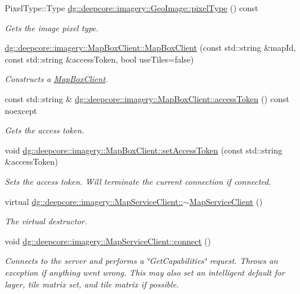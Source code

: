 \begin{DoxyCompactItemize}
Pixel\+Type\+::\+Type \hyperlink{group___imagery_module_gaf5164921d6c4514a57e2aa7243e6c572}{dg\+::deepcore\+::imagery\+::\+Geo\+Image\+::pixel\+Type} () const 
\begin{DoxyCompactList}\small\item\em Gets the image pixel type. \end{DoxyCompactList}\item 
\hyperlink{group___imagery_module_gaa985473361a183892437e5a57175aa25}{dg\+::deepcore\+::imagery\+::\+Map\+Box\+Client\+::\+Map\+Box\+Client} (const std\+::string \&map\+Id, const std\+::string \&access\+Token, bool use\+Tiles=false)
\begin{DoxyCompactList}\small\item\em Constructs a \hyperlink{classdg_1_1deepcore_1_1imagery_1_1_map_box_client}{Map\+Box\+Client}. \end{DoxyCompactList}\item 
const std\+::string \& \hyperlink{group___imagery_module_ga09b8428dd2d706d2816a06509cdefdf3}{dg\+::deepcore\+::imagery\+::\+Map\+Box\+Client\+::access\+Token} () const noexcept
\begin{DoxyCompactList}\small\item\em Gets the access token. \end{DoxyCompactList}\item 
void \hyperlink{group___imagery_module_ga24970dc0f6164b6592cb6a97bab71e15}{dg\+::deepcore\+::imagery\+::\+Map\+Box\+Client\+::set\+Access\+Token} (const std\+::string \&access\+Token)
\begin{DoxyCompactList}\small\item\em Sets the access token. Will terminate the current connection if connected. \end{DoxyCompactList}\item 
virtual \hyperlink{group___imagery_module_ga93933812a2678d47a119231a41b52e2d}{dg\+::deepcore\+::imagery\+::\+Map\+Service\+Client\+::$\sim$\+Map\+Service\+Client} ()
\begin{DoxyCompactList}\small\item\em The virtual destructor. \end{DoxyCompactList}\item 
void \hyperlink{group___imagery_module_ga5e5f58c725cafba7966936f688a6ade0}{dg\+::deepcore\+::imagery\+::\+Map\+Service\+Client\+::connect} ()
\begin{DoxyCompactList}\small\item\em Connects to the server and performs a \char`\"{}\+Get\+Capabilities\char`\"{} request. Throws an exception if anything went wrong. This may also set an intelligent default for layer, tile matrix set, and tile matrix if possible. \end{DoxyCompactList}\item 

\end{DoxyCompactItemize}
